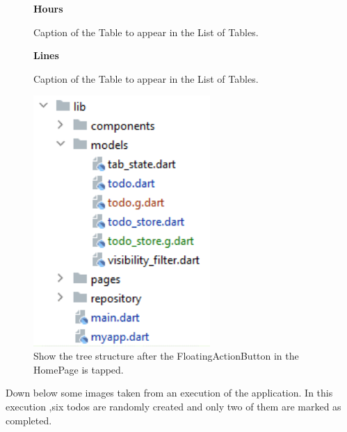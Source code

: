 \begin{figure}[H]
 \caption*{\textbf{Hours}}
\centering
{}
 \caption{Caption of the Table to appear in the List of Tables.}
\end{figure}

\begin{figure}[H]
\caption*{\textbf{Lines}}
\centering
{}
 \caption{Caption of the Table to appear in the List of Tables.}
\end{figure}



\begin{figure}[H]
    \centering
    \includegraphics[width=0.6\textwidth]{Images/struttura_cartelle_mobx.png}
    \caption{Show the tree structure after the FloatingActionButton in the HomePage is tapped.}
    \label{fig:add_todo_page_tree_structure}
\end{figure}
Down below some images taken from an execution of the application. In this execution ,six todos are randomly created and only two of them are marked as completed. 

